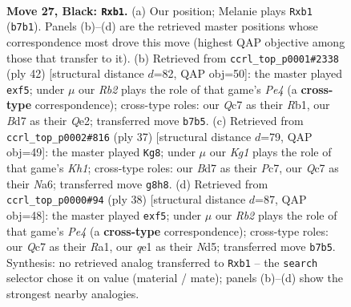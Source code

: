 \documentclass[11pt]{article}
\begin{document}
\clearpage

\begin{figure}[p]\centering
\begin{subfigure}{0.46\textwidth}\centering
\resizebox{\linewidth}{!}{%
\newchessgame
\chessboard[
  setfen={1n3rk1/1rqb1ppp/8/4Pp2/p4P2/2P5/P1P2KPP/1R2QBNR b - - 0 27},
  showmover=false,
  pgfstyle=straightmove, color=movearrow, markmove={b7-b1}
]}
\caption{}
\end{subfigure}\hfill
\begin{subfigure}{0.46\textwidth}\centering
\resizebox{\linewidth}{!}{%
\newchessgame
\chessboard[
  setfen={1r2qr1k/3b2pp/3p4/3Nppb1/1PB1P3/1p6/4QPPP/1R3RK1 w - - 0 22},
  showmover=false,
  pgfstyle=straightmove, color=movearrow, markmove={e4-f5}
]}
\caption{}
\end{subfigure}
\\[4pt]
\begin{subfigure}{0.46\textwidth}\centering
\resizebox{\linewidth}{!}{%
\newchessgame
\chessboard[
  setfen={4rr1k/ppp3pp/n2p4/3P1b1q/1P6/6P1/P2Q1NBP/R3R1K1 b - - 0 19},
  showmover=false,
  pgfstyle=straightmove, color=movearrow, markmove={h8-g8}
]}
\caption{}
\end{subfigure}\hfill
\begin{subfigure}{0.46\textwidth}\centering
\resizebox{\linewidth}{!}{%
\newchessgame
\chessboard[
  setfen={1r1q1r1k/3b2pp/3p4/3Nppb1/pPB1P3/8/1P3PPP/R2Q1RK1 w - - 0 20},
  showmover=false,
  pgfstyle=straightmove, color=movearrow, markmove={e4-f5}
]}
\caption{}
\end{subfigure}
\caption{\textbf{Move 27, Black: \texttt{Rxb1}.} (a) Our position; Melanie plays \texttt{Rxb1} (\texttt{b7b1}). Panels (b)--(d) are the retrieved master positions whose correspondence most drove this move (highest QAP objective among those that transfer to it). (b) Retrieved from \texttt{ccrl\_top\_p0001\#2338} (ply 42) [structural distance $d$=82, QAP obj=50]: the master played \texttt{exf5}; under $\mu$ our \emph{Rb2} plays the role of that game's \emph{Pe4} (a \textbf{cross-type} correspondence); cross-type roles: our \emph{Q}c7 as their \emph{R}b1, our \emph{B}d7 as their \emph{Q}e2; transferred move \texttt{b7b5}. (c) Retrieved from \texttt{ccrl\_top\_p0002\#816} (ply 37) [structural distance $d$=79, QAP obj=49]: the master played \texttt{Kg8}; under $\mu$ our \emph{Kg1} plays the role of that game's \emph{Kh1}; cross-type roles: our \emph{B}d7 as their \emph{P}c7, our \emph{Q}c7 as their \emph{N}a6; transferred move \texttt{g8h8}. (d) Retrieved from \texttt{ccrl\_top\_p0000\#94} (ply 38) [structural distance $d$=87, QAP obj=48]: the master played \texttt{exf5}; under $\mu$ our \emph{Rb2} plays the role of that game's \emph{Pe4} (a \textbf{cross-type} correspondence); cross-type roles: our \emph{Q}c7 as their \emph{R}a1, our \emph{q}e1 as their \emph{N}d5; transferred move \texttt{b7b5}. Synthesis: no retrieved analog transferred to \texttt{Rxb1} -- the \texttt{search} selector chose it on value (material / mate); panels (b)--(d) show the strongest nearby analogies.}
\label{fig:thought-m53}
\end{figure}
\end{document}
